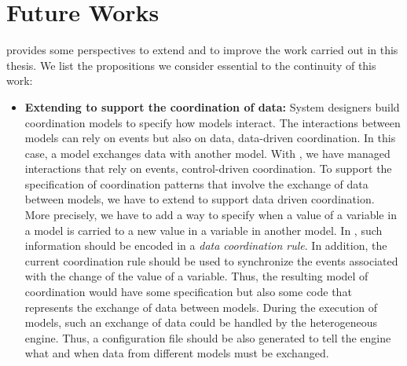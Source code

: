 	  
\section{Future Works}
\bcool provides some perspectives to extend and to improve the work carried out in this thesis. We list the propositions we consider essential to the continuity of this work:

\begin{itemize}
	\item \textbf{Extending \bcool to support the coordination of data:} System designers build coordination models to specify how models interact. The interactions between models can rely on events but also on data, \ie data-driven coordination. In this case, a model exchanges data with another model. With \bcool, we have managed interactions that rely on events, \ie control-driven coordination. To support the specification of coordination patterns that involve the exchange of data between models, we have to extend \bcool to support data driven coordination. More precisely, we have to add a way to specify when a value of a variable in a model is carried to a new value in a variable in another model. 
	In \bcool, such information should be encoded in a \emph{data coordination rule}. In addition, the current coordination rule should be used to synchronize the events associated with the change of the value of a variable. Thus, the resulting model of coordination would have some \ccsl specification but also some code that represents the exchange of data between models. During the execution of models, such an exchange of data could be handled by the heterogeneous engine. Thus, a configuration file should be also generated to tell the engine what and when data from different models must be exchanged.	
	   	 

\end{itemize}
